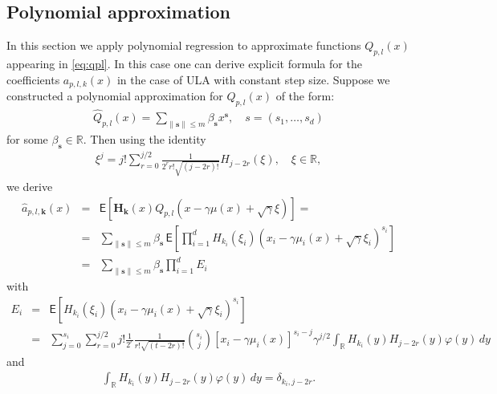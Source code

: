 \documentclass[article]{elsarticle}
\begin{document}
\subsection{Polynomial approximation}
In this section we apply  polynomial regression to approximate functions \(Q_{p,l}(x) \) appearing in \eqref{eq:qpl}.  In this case one can derive explicit formula for the coefficients $ a_{p,l,k}(x)$  in the case of ULA with constant step size. Suppose we constructed a polynomial approximation  for \(Q_{p,l}(x) \)  of the form:
\begin{eqnarray*}
\widehat Q_{p,l}(x) = \sum_{\|\mathbf{s}\|\leq m} \beta_{\mathbf{s}} x^{\mathbf{s}},\quad s=(s_1,\ldots,s_d)
\end{eqnarray*}
for some \(\beta_{\mathbf{s}}\in \mathbb{R}.\)
Then using the identity
\begin{eqnarray*}
\xi^j = j! \sum_{r = 0}^{j/2} \frac{1}{2^r  r! \sqrt{(j-2r)!}} H_{j-2r}(\xi),\quad \xi \in \mathbb{R},
\end{eqnarray*}
we derive
\begin{eqnarray*}
\widehat a_{p,l,\mathbf{k}} (x) &=&\mathsf{E} \left[ \mathbf{H}_\mathbf{k}(x) Q_{p,l}(x - \gamma \mu(x) + \sqrt{\gamma}\xi)\right] =
\\
&=&\sum_{\|\mathbf{s}\|\leq m} \beta_{\mathbf{s}} \,\mathsf{E} \left[ \prod_{i=1}^d H_{k_i}(\xi_i) (x_i - \gamma \mu_i(x) + \sqrt{\gamma} \xi_i)^{s_i} \right]
\\
&=& \sum_{\|\mathbf{s}\|\leq m} \beta_{\mathbf{s}} \prod_{i=1}^d E_i
\end{eqnarray*}
with
\begin{eqnarray*}
E_i &=& \mathsf{E} \left[ H_{k_i}(\xi_i) (x_i - \gamma \mu_i(x) + \sqrt{\gamma} \xi_i)^{s_i} \right]
\\
& = & \sum_{j=0}^{s_i} \sum_{r= 0}^{ j/2} j! \frac{1}{2^r} \frac{1}{r! \sqrt{(t-2r)!}} \binom{s_i}{j} \left[ x_i - \gamma \mu_i(x) \right]^{s_i-j} \gamma^{j/2} \int_{\mathbb{R}} H_{k_i}(y) H_{j - 2r}(y) \varphi(y)\, d y
\end{eqnarray*}
and
\begin{eqnarray*}
\int_{\mathbb{R}} H_{k_i}(y) H_{j - 2r}(y) \varphi(y)\, d y = \delta_{k_i, j-2r}.
\end{eqnarray*}
\end{document}
